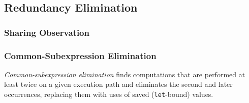 \subsection{Redundancy Elimination}
\subsubsection{Sharing Observation}

\subsubsection{Common-Subexpression Elimination}
\label{sec:cse}

\emph{Common-subexpression elimination} finds computations that are performed at
least twice on a given execution path and eliminates the second and later
occurrences, replacing them with uses of saved (\texttt{let}-bound) values.



